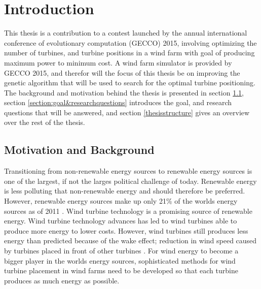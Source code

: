 \chapter{Introduction}
This thesis is a contribution to a contest launched by the annual international conference of evolutionary computation (GECCO) 2015, involving optimizing the number of turbines, and turbine positions in a wind farm with goal of producing maximum power to minimum cost. A wind farm simulator is provided by GECCO 2015, and therefor will the focus of this thesis be on improving the genetic algorithm that will be used to search for the optimal turbine positioning. The background and motivation behind the thesis is presented in section \ref{section:motivation&background}, section \ref{section:goal&researchquestions} introduces the goal, and research questions that will be answered, and section \ref{thesisstructure} gives an overview over the rest of the thesis. 


\section{Motivation and Background}\label{section:motivation&background}
Transitioning from non-renewable energy sources to renewable energy sources is one of the largest, if not the larges political challenge of today. Renewable energy is less polluting that non-renewable energy and should therefore be preferred. However, renewable energy sources make up only 21\% of the worlds energy sources as of 2011 \citep{url1}. Wind turbine technology is a promising source of renewable energy. Wind turbine technology advances has led to wind turbines able to produce more energy to lower costs. However, wind turbines still produces less energy than predicted because of the wake effect; reduction in wind speed caused by turbines placed in front of other turbines \citep{Samorani}. For wind energy to become a bigger player in the worlds energy sources, sophisticated methods for wind turbine placement in wind farms need to be developed so that each turbine produces as much energy as possible. \\

